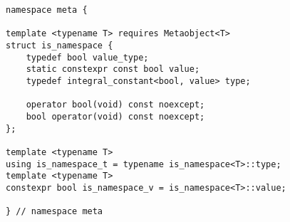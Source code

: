 
\begin{verbatim}
namespace meta {

template <typename T> requires Metaobject<T>
struct is_namespace {
	typedef bool value_type;
	static constexpr const bool value;
	typedef integral_constant<bool, value> type;

	operator bool(void) const noexcept;
	bool operator(void) const noexcept;
};

template <typename T>
using is_namespace_t = typename is_namespace<T>::type;
template <typename T>
constexpr bool is_namespace_v = is_namespace<T>::value;

} // namespace meta
\end{verbatim}
